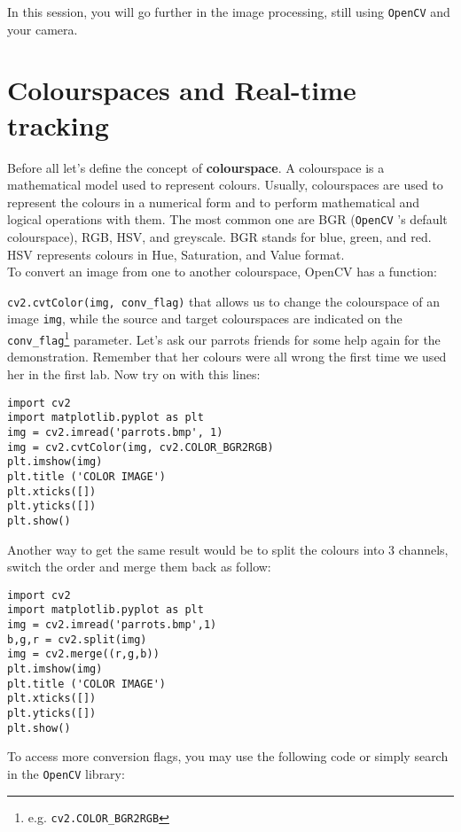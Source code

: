 \documentclass{labo}
\author{}
\newcommand{\opencv}{\texttt{OpenCV} }
\begin{document}

In this session, you will go further in the image processing, still using \opencv and your camera.

\section*{Colourspaces and Real-time tracking}
Before all let’s define the concept of \textbf{colourspace}. A colourspace is a mathematical model used to
represent colours. Usually, colourspaces are used to represent the colours in a numerical form and to
perform mathematical and logical operations with them. The most common one are BGR (\opencv's
default colourspace), RGB, HSV, and greyscale. BGR stands for blue, green, and red. HSV represents
colours in Hue, Saturation, and Value format.\\

To convert an image from one to another colourspace, OpenCV has a function:

\texttt{cv2.cvtColor(img, conv\_flag)} that allows us to change the colourspace of an image \texttt{img}, while the source and target colourspaces are indicated on the \texttt{conv\_flag}\footnote{e.g. \texttt{cv2.COLOR\_BGR2RGB}} parameter. Let’s ask our parrots friends for some help again for the demonstration. Remember that her colours were all wrong the first time we used her in the first lab.
Now try on with this lines:

\begin{verbatim}
import cv2
import matplotlib.pyplot as plt
img = cv2.imread('parrots.bmp', 1)
img = cv2.cvtColor(img, cv2.COLOR_BGR2RGB)
plt.imshow(img)
plt.title ('COLOR IMAGE')
plt.xticks([])
plt.yticks([])
plt.show()
\end{verbatim}

Another way to get the same result would be to split the colours into 3 channels, switch the order and merge them back as follow:

\begin{verbatim}
import cv2
import matplotlib.pyplot as plt
img = cv2.imread('parrots.bmp',1)
b,g,r = cv2.split(img)
img = cv2.merge((r,g,b))
plt.imshow(img)
plt.title ('COLOR IMAGE')
plt.xticks([])
plt.yticks([])
plt.show()
\end{verbatim}

To access more conversion flags, you may use the following code or simply search in the \opencv library:
\end{document}
